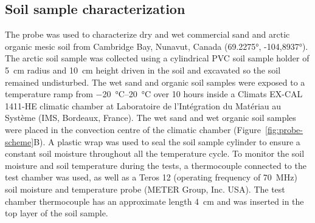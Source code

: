 \subsection{Soil sample characterization}\label{subsec:metho-soil}
The probe was used to characterize dry and wet commercial sand and arctic organic mesic soil from Cambridge Bay, Nunavut, Canada (\ang{69.2275}, \ang{-104,8937}).
The arctic soil sample was collected using a cylindrical PVC soil sample holder of \qty{5}{\cm} radius and \qty{10}{\cm} height driven in the soil and excavated so the soil remained undisturbed.
The wet sand and organic soil samples were exposed to a temperature ramp from \qtyrange{-20}{20}{\degreeCelsius} over 10 hours inside a Climats EX-CAL 1411-HE climatic chamber at Laboratoire de l'Intégration du Matériau au Système (IMS, Bordeaux, France).
The wet sand and wet organic soil samples were placed in the convection centre of the climatic chamber (Figure~\ref{fig:probe-scheme}B).
A plastic wrap was used to seal the soil sample cylinder to ensure a constant soil moisture throughout all the temperature cycle.
To monitor the soil moisture and soil temperature during the tests, a thermocouple connected to the test chamber was used, as well as a Teros 12 (operating frequency of \qty{70}{\mega\hertz}) soil moisture and temperature probe (METER Group, Inc. USA).
The test chamber thermocouple has an approximate length \qty{4}{\cm} and was inserted in the top layer of the soil sample.

